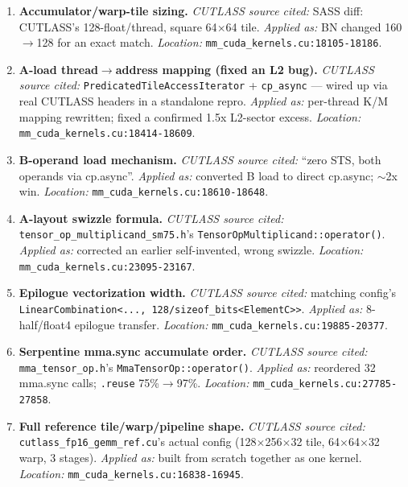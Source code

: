 \documentclass[11pt]{article}
\begin{document}
\begin{enumerate}[leftmargin=*]
\item \textbf{Accumulator/warp-tile sizing.}
\textit{CUTLASS source cited:} SASS diff: CUTLASS's 128-float/thread,
square 64$\times$64 tile.
\textit{Applied as:} BN changed 160$\to$128 for an exact match.
\textit{Location:} \texttt{mm\_cuda\_kernels.cu:18105-18186}.

\item \textbf{A-load thread$\to$address mapping (fixed an L2 bug).}
\textit{CUTLASS source cited:} \texttt{PredicatedTileAccessIterator} +
\texttt{cp\_async} --- wired up via real CUTLASS headers in a standalone
repro.
\textit{Applied as:} per-thread K/M mapping rewritten; fixed a confirmed
1.5x L2-sector excess.
\textit{Location:} \texttt{mm\_cuda\_kernels.cu:18414-18609}.

\item \textbf{B-operand load mechanism.}
\textit{CUTLASS source cited:} ``zero STS, both operands via cp.async''.
\textit{Applied as:} converted B load to direct cp.async; $\sim$2x win.
\textit{Location:} \texttt{mm\_cuda\_kernels.cu:18610-18648}.

\item \textbf{A-layout swizzle formula.}
\textit{CUTLASS source cited:} \texttt{tensor\_op\_multiplicand\_sm75.h}'s
\texttt{TensorOpMultiplicand::operator()}.
\textit{Applied as:} corrected an earlier self-invented, wrong swizzle.
\textit{Location:} \texttt{mm\_cuda\_kernels.cu:23095-23167}.

\item \textbf{Epilogue vectorization width.}
\textit{CUTLASS source cited:} matching config's
\texttt{LinearCombination<..., 128/sizeof\_bits<ElementC>>}.
\textit{Applied as:} 8-half/float4 epilogue transfer.
\textit{Location:} \texttt{mm\_cuda\_kernels.cu:19885-20377}.

\item \textbf{Serpentine mma.sync accumulate order.}
\textit{CUTLASS source cited:} \texttt{mma\_tensor\_op.h}'s
\texttt{MmaTensorOp::operator()}.
\textit{Applied as:} reordered 32 mma.sync calls; \texttt{.reuse}
75\%$\to$97\%.
\textit{Location:} \texttt{mm\_cuda\_kernels.cu:27785-27858}.

\item \textbf{Full reference tile/warp/pipeline shape.}
\textit{CUTLASS source cited:} \texttt{cutlass\_fp16\_gemm\_ref.cu}'s
actual config (128$\times$256$\times$32 tile, 64$\times$64$\times$32 warp, 3
stages).
\textit{Applied as:} built from scratch together as one kernel.
\textit{Location:} \texttt{mm\_cuda\_kernels.cu:16838-16945}.


\end{enumerate}
\end{document}
